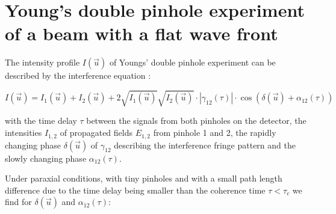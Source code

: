 \documentclass{osa-article}
\begin{document}








\section{Young's double pinhole experiment of a beam with a flat wave front}

The intensity profile $ I(\vec{u}) $ of Youngs' double pinhole experiment \cite[fig. 5.12]{Goodman2015-StatisticalOptics2e} can be described by the interference equation \cite[eq. (2.5-4)]{BahaaE.A.Saleh2007-FundamentalsPhotonics}:

\begin{equation}
    I(\vec{u}) = I_1(\vec{u}) + I_2(\vec{u}) + 2 \sqrt{I_1(\vec{u})} \sqrt{I_2(\vec{u})} \cdot | \gamma_{12}(\tau) | \cdot \cos{\left(\delta(\vec{u})+\alpha_{12}(\tau)\right)}
    \label{eq:interference1}
\end{equation}

with the time delay $ \tau $ between the signals from both pinholes on the detector, the intensities $ I_{1,2} $ of propagated fields $ E_{1,2} $ from pinhole 1 and 2, the rapidly changing phase $ \delta(\vec{u}) $ of $ \gamma_{12} $ describing the interference fringe pattern and the slowly changing phase $ \alpha_{12}(\tau) $.

Under paraxial conditions, with tiny pinholes \cite[eq. (5.2-34)]{Goodman2015-StatisticalOptics2e} and with a small path length difference due to the time delay being smaller than the coherence time $\tau < \tau_c$ we find for $ \delta(\vec{u}) $ and $ \alpha_{12}(\tau) $:
\end{document}
